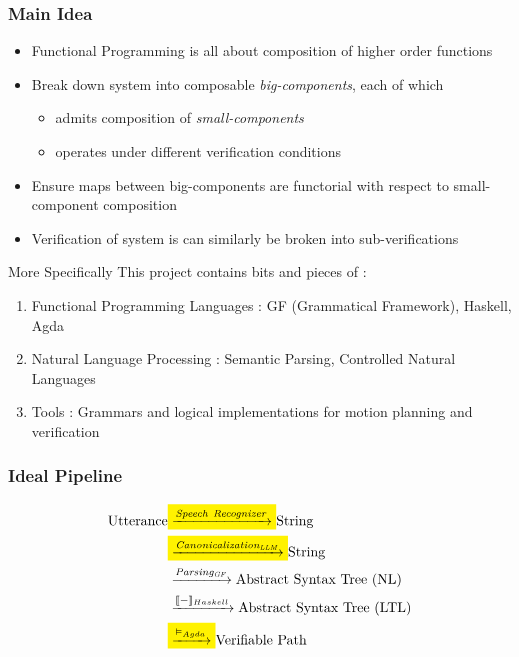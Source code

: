 \documentclass{beamer}
\newcommand{\mathcolorbox}[2]{\colorbox{#1}{$\displaystyle #2$}}
\begin{document}
\begin{frame}
\frametitle{Main Idea}

\begin{itemize}[<+->]
\item Functional Programming is all about composition of higher order functions
\item Break down system into composable \emph{big-components}, each of which
\begin{itemize}[<+->]
\item admits composition of \emph{small-components}
\item operates under different verification conditions
\end{itemize}
\item Ensure maps between big-components are functorial with respect to
  small-component composition
\item Verification of system is can similarly be broken into sub-verifications
\end{itemize}
\end{frame}


\begin{frame}
\begin{exampleblock}{More Specifically}
This project contains bits and pieces of :
\end{exampleblock}
\pause
\begin{enumerate}[<+->]
\item Functional Programming Languages : GF (Grammatical Framework), Haskell, Agda
\item Natural Language Processing : Semantic Parsing, Controlled Natural Languages
\item Tools : Grammars and logical implementations for motion planning and verification
\end{enumerate}
\end{frame}


\begin{frame}
\frametitle{Ideal Pipeline}

\begin{equation} %
\begin{split}
\text{Utterance} & \mathcolorbox{yellow}{\xrightarrow{\mathit{Speech\ Recognizer}}} \text{String}\\
 & \mathcolorbox{yellow}{\xrightarrow{\mathit{Canonicalization_{LLM}}}} \text{String}\\
 & \xrightarrow{\mathit{Parsing_{GF}}} \text{Abstract Syntax Tree (NL)}\\
 & \xrightarrow{\llbracket - \rrbracket_{Haskell}} \text{Abstract Syntax Tree (LTL)}\\
 & \mathcolorbox{yellow}{\xrightarrow{\vDash_{Agda}}} \text{Verifiable Path}
\end{split}
\end{equation} 
\end{frame}
\end{document}
